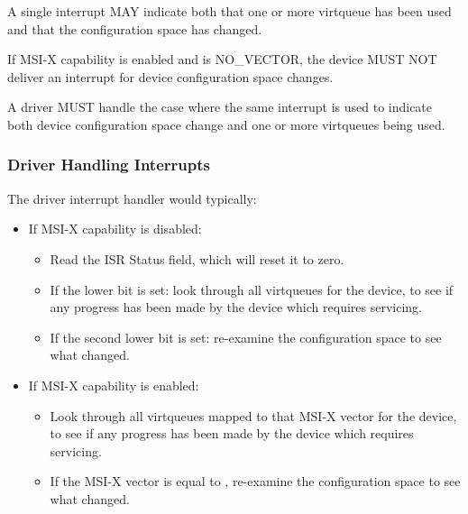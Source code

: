 A single interrupt MAY indicate both that one or more virtqueue has
been used and that the configuration space has changed.


If MSI-X capability is enabled and  is
NO_VECTOR, the device MUST NOT deliver an interrupt
for device configuration space changes.


A driver MUST handle the case where the same interrupt is used to indicate
both device configuration space change and one or more virtqueues being used.

\subsubsection{Driver Handling Interrupts}\label{sec:Virtio Transport Options / Virtio Over PCI Bus / PCI-specific Initialization And Device Operation / Driver Handling Interrupts}
The driver interrupt handler would typically:

\begin{itemize}
  \item If MSI-X capability is disabled:
    \begin{itemize}
      \item Read the ISR Status field, which will reset it to zero.
      \item If the lower bit is set:
        look through all virtqueues for the
        device, to see if any progress has been made by the device
        which requires servicing.
      \item If the second lower bit is set:
        re-examine the configuration space to see what changed.
    \end{itemize}
  \item If MSI-X capability is enabled:
    \begin{itemize}
      \item
        Look through all virtqueues mapped to that MSI-X vector for the
        device, to see if any progress has been made by the device
        which requires servicing.
      \item
        If the MSI-X vector is equal to ,
        re-examine the configuration space to see what changed.
    \end{itemize}
\end{itemize}

